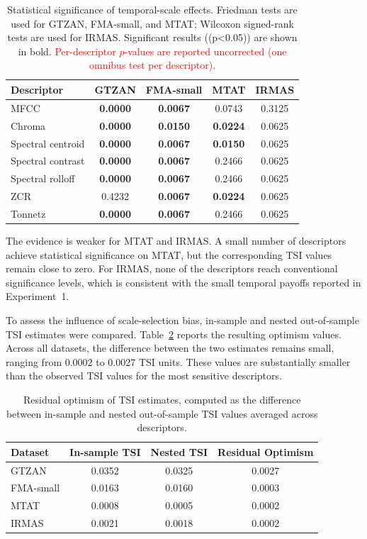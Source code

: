 \documentclass[runningheads]{llncs}
\begin{document}
\begin{table}[ht]
\centering
\caption{Statistical significance of temporal-scale effects. Friedman tests are used for GTZAN, FMA-small, and MTAT; Wilcoxon signed-rank tests are used for IRMAS. Significant results ((p<0.05)) are shown in bold. \textcolor{red}{Per-descriptor $p$-values are reported uncorrected (one omnibus test per descriptor).}}
\label{tab:pvalues}
\begin{tabular}{|l|c|c|c|c|}
\hline
Descriptor & GTZAN & FMA-small & MTAT & IRMAS \\
\hline
MFCC & \textbf{0.0000} & \textbf{0.0067} & 0.0743 & 0.3125 \\
Chroma & \textbf{0.0000} & \textbf{0.0150} & \textbf{0.0224} & 0.0625 \\
Spectral centroid & \textbf{0.0000} & \textbf{0.0067} & \textbf{0.0150} & 0.0625 \\
Spectral contrast & \textbf{0.0000} & \textbf{0.0067} & 0.2466 & 0.0625 \\
Spectral rolloff & \textbf{0.0000} & \textbf{0.0067} & 0.2466 & 0.0625 \\
ZCR & 0.4232 & \textbf{0.0067} & \textbf{0.0224} & 0.0625 \\
Tonnetz & \textbf{0.0000} & \textbf{0.0067} & 0.2466 & 0.0625 \\
\hline
\end{tabular}
\end{table}

The evidence is weaker for MTAT and IRMAS. A small number of descriptors achieve statistical significance on MTAT, but the corresponding TSI values remain close to zero. For IRMAS, none of the descriptors reach conventional significance levels, which is consistent with the small temporal payoffs reported in Experiment~1.

To assess the influence of scale-selection bias, in-sample and nested out-of-sample TSI estimates were compared. Table~\ref{tab:residual} reports the resulting optimism values. Across all datasets, the difference between the two estimates remains small, ranging from 0.0002 to 0.0027 TSI units. These values are substantially smaller than the observed TSI values for the most sensitive descriptors.

\begin{table}[ht]
\centering
\caption{Residual optimism of TSI estimates, computed as the difference between in-sample and nested out-of-sample TSI values averaged across descriptors.}
\label{tab:residual}
\begin{tabular}{|l|c|c|c|}
\hline
Dataset & In-sample TSI & Nested TSI & Residual Optimism \\
\hline
GTZAN & 0.0352 & 0.0325 & 0.0027 \\
FMA-small & 0.0163 & 0.0160 & 0.0003 \\
MTAT & 0.0008 & 0.0005 & 0.0002 \\
IRMAS & 0.0021 & 0.0018 & 0.0002 \\
\hline
\end{tabular}
\end{table}
\end{document}

